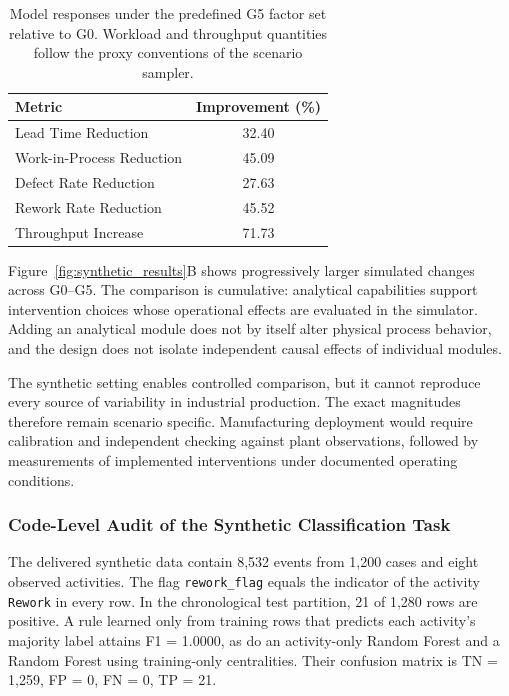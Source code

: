 \documentclass[pdflatex,iicol,Numbered,sn-basic]{sn-jnl}
\begin{document}
\begin{table}[t]
\caption{
Model responses under the predefined G5 factor set relative to G0. Workload and throughput quantities follow the proxy conventions of the scenario sampler.
}
\label{tab:synthetic_improvements}
\centering
\begin{tabular}{lc}
\toprule
\textbf{Metric} & \textbf{Improvement (\%)} \\
\midrule
Lead Time Reduction & 32.40 \\
Work-in-Process Reduction & 45.09 \\
Defect Rate Reduction & 27.63 \\
Rework Rate Reduction & 45.52 \\
Throughput Increase & 71.73 \\
\bottomrule
\end{tabular}
\end{table}

Figure~\ref{fig:synthetic_results}B shows progressively larger simulated changes across G0--G5. The comparison is cumulative: analytical capabilities support intervention choices whose operational effects are evaluated in the simulator. Adding an analytical module does not by itself alter physical process behavior, and the design does not isolate independent causal effects of individual modules.

The synthetic setting enables controlled comparison, but it cannot reproduce every source of variability in industrial production. The exact magnitudes therefore remain scenario specific. Manufacturing deployment would require calibration and independent checking against plant observations, followed by measurements of implemented interventions under documented operating conditions.

\subsubsection{Code-Level Audit of the Synthetic Classification Task}
\label{subsec:synthetic_code_audit}

The delivered synthetic data contain 8,532 events from 1,200 cases and eight observed activities. The flag \texttt{rework\_flag} equals the indicator of the activity \texttt{Rework} in every row. In the chronological test partition, 21 of 1,280 rows are positive. A rule learned only from training rows that predicts each activity's majority label attains F1 = 1.0000, as do an activity-only Random Forest and a Random Forest using training-only centralities. Their confusion matrix is TN = 1,259, FP = 0, FN = 0, TP = 21.
\end{document}
